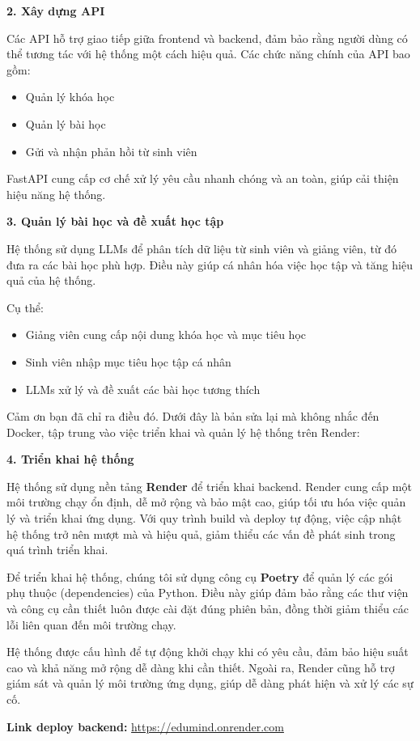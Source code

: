 \textbf{2. Xây dựng API} 

Các API hỗ trợ giao tiếp giữa frontend và backend, đảm bảo rằng người dùng có thể tương tác với hệ thống một cách hiệu quả. Các chức năng chính của API bao gồm:

\begin{itemize}
    \item Quản lý khóa học
    \item Quản lý bài học
    \item Gửi và nhận phản hồi từ sinh viên
\end{itemize}

FastAPI cung cấp cơ chế xử lý yêu cầu nhanh chóng và an toàn, giúp cải thiện hiệu năng hệ thống.

\textbf{3. Quản lý bài học và đề xuất học tập} 

Hệ thống sử dụng LLMs để phân tích dữ liệu từ sinh viên và giảng viên, từ đó đưa ra các bài học phù hợp. Điều này giúp cá nhân hóa việc học tập và tăng hiệu quả của hệ thống.

Cụ thể:

\begin{itemize}
    \item Giảng viên cung cấp nội dung khóa học và mục tiêu học
    \item Sinh viên nhập mục tiêu học tập cá nhân
    \item LLMs xử lý và đề xuất các bài học tương thích
\end{itemize}


Cảm ơn bạn đã chỉ ra điều đó. Dưới đây là bản sửa lại mà không nhắc đến Docker, tập trung vào việc triển khai và quản lý hệ thống trên Render:

\textbf{4. Triển khai hệ thống}

Hệ thống sử dụng nền tảng \textbf{Render} để triển khai backend. Render cung cấp một môi trường chạy ổn định, dễ mở rộng và bảo mật cao, giúp tối ưu hóa việc quản lý và triển khai ứng dụng. Với quy trình build và deploy tự động, việc cập nhật hệ thống trở nên mượt mà và hiệu quả, giảm thiểu các vấn đề phát sinh trong quá trình triển khai.

Để triển khai hệ thống, chúng tôi sử dụng công cụ \textbf{Poetry} để quản lý các gói phụ thuộc (dependencies) của Python. Điều này giúp đảm bảo rằng các thư viện và công cụ cần thiết luôn được cài đặt đúng phiên bản, đồng thời giảm thiểu các lỗi liên quan đến môi trường chạy.

Hệ thống được cấu hình để tự động khởi chạy khi có yêu cầu, đảm bảo hiệu suất cao và khả năng mở rộng dễ dàng khi cần thiết. Ngoài ra, Render cũng hỗ trợ giám sát và quản lý môi trường ứng dụng, giúp dễ dàng phát hiện và xử lý các sự cố.
\par \textbf{Link deploy backend:} 
\textcolor{blue}{\href{https://edumind.onrender.com}{https://edumind.onrender.com}}

